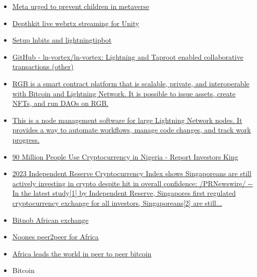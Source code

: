 \begin{itemize}
{  million meta VR users, against 60B spent}
\item
  \href{https://www.bloomberg.com/news/articles/2023-04-14/meta-urged-to-halt-plans-allowing-minors-into-the-metaverse?leadSource=uverify\%20wall}{Meta
  urged to prevent children in metaverse}
\item
  \href{https://docs.depthkit.tv/docs/remote-livestreaming-with-webrtc}{Depthkit
  live webrtx streaming for Unity}
\item
  \href{https://www.massmux.com/howto-complete-lightningtipbot-lnbits-setup-vps/}{Setup
  lnbits and lightningtipbot}
\item
  \href{https://github.com/ln-vortex/ln-vortex}{GitHub -
  ln-vortex/ln-vortex: Lightning and Taproot enabled collaborative
  transactions (other)}
\item
  \href{https://rgb.tech/?ref=nobsbitcoin.com}{RGB is a smart contract
  platform that is scalable, private, and interoperable with Bitcoin and
  Lightning Network. It is possible to issue assets, create NFTs, and
  run DAOs on RGB.}
\item
  \href{https://github.com/lncapital/torq}{This is a node management
  software for large Lightning Network nodes. It provides a way to
  automate workflows, manage code changes, and track work progress.}
\item
  \href{https://investorsking.com/2023/03/08/90-million-people-use-cryptocurrency-in-nigeria-reports/}{90
  Million People Use Cryptocurrency in Nigeria - Report \textbar{}
  Investors King}
\item
  \href{https://www.prnewswire.com/apac/news-releases/2023-independent-reserve-cryptocurrency-index-shows-singaporeans-are-still-actively-investing-in-crypto-despite-hit-in-overall-confidence-301783400.html}{2023
  Independent Reserve Cryptocurrency Index shows Singaporeans are still
  actively investing in crypto despite hit in overall confidence:
  /PRNewswire/ -\/- In the latest study{[}1{]} by Independent Reserve,
  Singapore\textquotesingle s first regulated cryptocurrency exchange
  for all investors, Singaporeans{[}2{]} are still...}
\item
  \href{https://bitnob.com/blog/how-to-buy-and-sell-bitcoin-in-nigeria}{Bitnob
  African exchange}
\item
  \href{https://bitcoinmagazine.com/business/bitcoin-entrepreneurs-introduce-noones-app-aimed-at-empowering-financial-freedom}{Noones
  peer2peer for Africa}
\item
  \href{https://twitter.com/documentingbtc/status/1646656229958361091}{Africa
  leads the world in peer to peer bitcoin}
\item
  Bitcoin


\end{itemize}
